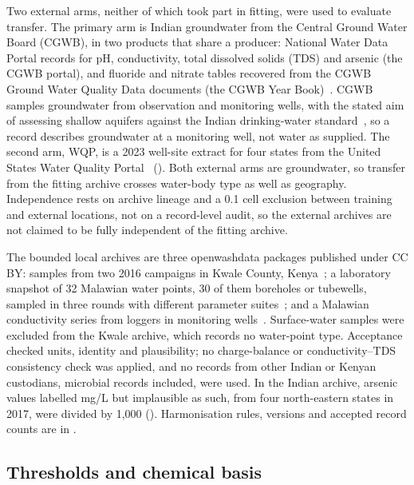 \documentclass[10pt,letterpaper]{article}
\begin{document}
Two external arms, neither of which took part in fitting, were used to evaluate transfer. The primary arm is Indian groundwater from the Central Ground Water Board (CGWB), in two products that share a producer: National Water Data Portal records for pH, conductivity, total dissolved solids (TDS) and arsenic (the CGWB portal), and fluoride and nitrate tables recovered from the CGWB Ground Water Quality Data documents (the CGWB Year Book)~\cite{CGWB-NWDP,CGWB-GWQ2019,CGWB-GWQ2021,CGWB-GWQ2022}. CGWB samples groundwater from observation and monitoring wells, with the stated aim of assessing shallow aquifers against the Indian drinking-water standard~\cite{CGWB-AGWQR2025}, so a record describes groundwater at a monitoring well, not water as supplied. The second arm, WQP, is a 2023 well-site extract for four states from the United States Water Quality Portal~\cite{WQP} (). Both external arms are groundwater, so transfer from the fitting archive crosses water-body type as well as geography. Independence rests on archive lineage and a 0.1\textdegree{} cell exclusion between training and external locations, not on a record-level audit, so the external archives are not claimed to be fully independent of the fitting archive.

The bounded local archives are three openwashdata packages published under CC BY: samples from two 2016 campaigns in Kwale County, Kenya~\cite{OWD-grdwtrsmpkwale}; a laboratory snapshot of 32 Malawian water points, 30 of them boreholes or tubewells, sampled in three rounds with different parameter suites~\cite{OWD-boreholelabdata}; and a Malawian conductivity series from loggers in monitoring wells~\cite{OWD-mwgroundwaterdata}. Surface-water samples were excluded from the Kwale archive, which records no water-point type. Acceptance checked units, identity and plausibility; no charge-balance or conductivity--TDS consistency check was applied, and no records from other Indian or Kenyan custodians, microbial records included, were used. In the Indian archive, arsenic values labelled mg/L but implausible as such, from four north-eastern states in 2017, were divided by 1,000 (). Harmonisation rules, versions and accepted record counts are in .

\subsection*{Thresholds and chemical basis}
\end{document}
